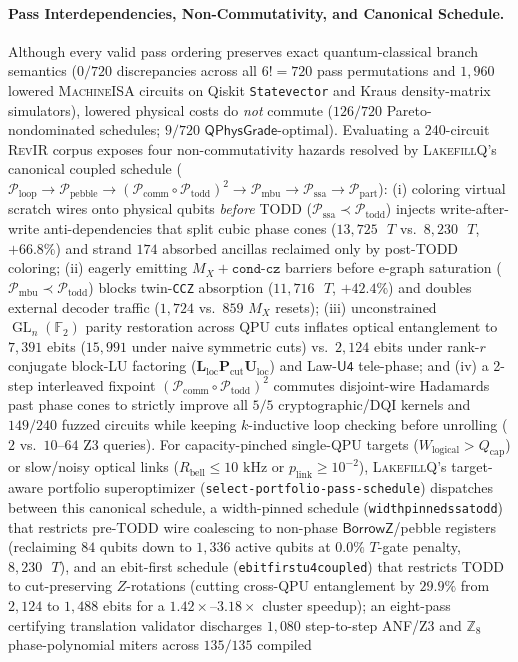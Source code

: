 \documentclass[acmsmall,screen,anonymous]{acmart}
\DeclareRobustCommand{\_}{\ifmmode\text{\char95}\else\char95\penalty0\relax\fi}
\theoremstyle{plain}
\newcommand{\LakefillQ}{\textsc{LakefillQ}}
\newcommand{\RevIR}{\textsc{RevIR}}
\newcommand{\MachineISA}{\textsc{MachineISA}}
\newcommand{\QPhysGrade}{\ensuremath{\mathsf{QPhysGrade}}}
\newcommand{\CapBorrowZ}{\ensuremath{\mathsf{BorrowZ}}}
\begin{document}
\paragraph{Pass Interdependencies, Non-Commutativity, and Canonical Schedule.}
Although every valid pass ordering preserves exact quantum-classical branch semantics ($0/720$ discrepancies across all $6! = 720$ pass permutations and $1{,}960$ lowered \MachineISA{} circuits on Qiskit \texttt{Statevector} and Kraus density-matrix simulators), lowered physical costs do \emph{not} commute ($126/720$ Pareto-nondominated schedules; $9/720$ $\QPhysGrade$-optimal). Evaluating a 240-circuit \RevIR{} corpus exposes four non-commutativity hazards resolved by \LakefillQ{}'s canonical coupled schedule ($\mathcal{P}_{\mathrm{loop}} \to \mathcal{P}_{\mathrm{pebble}} \to (\mathcal{P}_{\mathrm{comm}} \circ \mathcal{P}_{\mathrm{todd}})^2 \to \mathcal{P}_{\mathrm{mbu}} \to \mathcal{P}_{\mathrm{ssa}} \to \mathcal{P}_{\mathrm{part}}$): (i) coloring virtual scratch wires onto physical qubits \emph{before} TODD ($\mathcal{P}_{\mathrm{ssa}} \prec \mathcal{P}_{\mathrm{todd}}$) injects write-after-write anti-dependencies that split cubic phase cones ($13{,}725\text{ }T$ vs.\ $8{,}230\text{ }T$, $+66.8\%$) and strand $174$ absorbed ancillas reclaimed only by post-TODD coloring; (ii) eagerly emitting $M_X + \texttt{cond-cz}$ barriers before e-graph saturation ($\mathcal{P}_{\mathrm{mbu}} \prec \mathcal{P}_{\mathrm{todd}}$) blocks twin-\texttt{CCZ} absorption ($11{,}716\text{ }T$, $+42.4\%$) and doubles external decoder traffic ($1{,}724$ vs.\ $859$ $M_X$ resets); (iii) unconstrained $\operatorname{GL}_n(\mathbb{F}_2)$ parity restoration across QPU cuts inflates optical entanglement to $7{,}391$ ebits ($15{,}991$ under naive symmetric cuts) vs.\ $2{,}124$ ebits under rank-$r$ conjugate block-LU factoring ($\mathbf{L}_{\mathrm{loc}} \mathbf{P}_{\mathrm{cut}} \mathbf{U}_{\mathrm{loc}}$) and Law-$\mathsf{U4}$ tele-phase; and (iv) a 2-step interleaved fixpoint $(\mathcal{P}_{\mathrm{comm}} \circ \mathcal{P}_{\mathrm{todd}})^2$ commutes disjoint-wire Hadamards past phase cones to strictly improve all $5/5$ cryptographic/DQI kernels and $149/240$ fuzzed circuits while keeping $k$-inductive loop checking before unrolling ($2$ vs.\ $10$--$64$ Z3 queries). For capacity-pinched single-QPU targets ($W_{\mathrm{logical}} > Q_{\mathrm{cap}}$) or slow/noisy optical links ($R_{\mathrm{bell}} \le 10\text{ kHz}$ or $p_{\mathrm{link}} \ge 10^{-2}$), \LakefillQ{}'s target-aware portfolio superoptimizer (\texttt{select-portfolio\allowbreak-pass-schedule}) dispatches between this canonical schedule, a width-pinned schedule (\texttt{width\_pinned\allowbreak\_ssa\_todd}) that restricts pre-TODD wire coalescing to non-phase $\CapBorrowZ$/pebble registers (reclaiming $84$ qubits down to $1{,}336$ active qubits at $0.0\%$ $T$-gate penalty, $8{,}230\text{ }T$), and an ebit-first schedule (\texttt{ebit\_first\allowbreak\_u4\_coupled}) that restricts TODD to cut-preserving $Z$-rotations (cutting cross-QPU entanglement by $29.9\%$ from $2{,}124$ to $1{,}488$ ebits for a $1.42\times$--$3.18\times$ cluster speedup); an eight-pass certifying translation validator discharges $1{,}080$ step-to-step ANF/Z3 and $\mathbb{Z}_8$ phase-polynomial miters across $135/135$ compiled 
\end{document}
